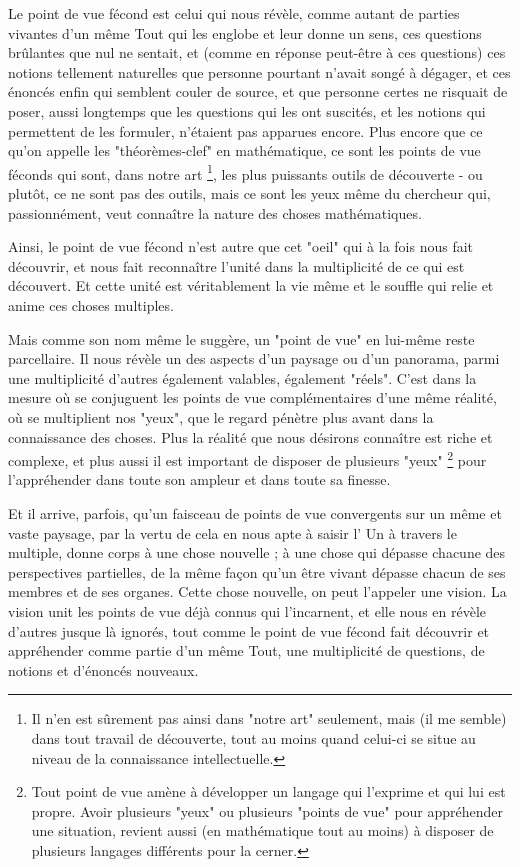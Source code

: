 Le point de vue fécond est celui qui nous révèle, comme autant de parties vivantes d'un même Tout qui les englobe et leur donne un sens, ces questions brûlantes que nul ne sentait, et (comme en réponse peut-être à ces questions) ces notions tellement naturelles que personne pourtant n'avait songé à dégager, et ces énoncés enfin qui semblent couler de source, et que personne certes ne risquait de poser, aussi longtemps que les questions qui les ont suscités, et les notions qui permettent de les formuler, n'étaient pas apparues encore. Plus encore que ce qu'on appelle les "théorèmes-clef" en mathématique, ce sont les points de vue féconds qui sont, dans notre art \footnote{Il n'en est sûrement pas ainsi dans "notre art" seulement, mais (il me semble) dans tout travail de découverte, tout au moins quand celui-ci se situe au niveau de la connaissance intellectuelle.}, les plus puissants outils de découverte - ou plutôt, ce ne sont pas des outils, mais ce sont les yeux même du chercheur qui, passionnément, veut connaître la nature des choses mathématiques.

Ainsi, le point de vue fécond n'est autre que cet "oeil" qui à la fois nous fait découvrir, et nous fait reconnaître l'unité dans la multiplicité de ce qui est découvert. Et cette unité est véritablement la vie même et le souffle qui relie et anime ces choses multiples.

Mais comme son nom même le suggère, un "point de vue" en lui-même reste parcellaire. Il nous révèle un des aspects d'un paysage ou d'un panorama, parmi une multiplicité d'autres également valables, également "réels". C'est dans la mesure où se conjuguent les points de vue complémentaires d'une même réalité, où se multiplient nos "yeux", que le regard pénètre plus avant dans la connaissance des choses. Plus la réalité que nous désirons connaître est riche et complexe, et plus aussi il est important de disposer de plusieurs "yeux" \footnote{Tout point de vue amène à développer un langage qui l'exprime et qui lui est propre. Avoir plusieurs "yeux" ou plusieurs "points de vue" pour appréhender une situation, revient aussi (en mathématique tout au moins) à disposer de plusieurs langages différents pour la cerner.} pour l'appréhender dans toute son ampleur et dans toute sa finesse.

Et il arrive, parfois, qu'un faisceau de points de vue convergents sur un même et vaste paysage, par la vertu de cela en nous apte à saisir l' Un à travers le multiple, donne corps à une chose nouvelle ; à une chose qui dépasse chacune des perspectives partielles, de la même façon qu'un être vivant dépasse chacun de ses membres et de ses organes. Cette chose nouvelle, on peut l'appeler une vision. La vision unit les points de vue déjà connus qui l'incarnent, et elle nous en révèle d'autres jusque là ignorés, tout comme le point de vue fécond fait découvrir et appréhender comme partie d'un même Tout, une multiplicité de questions, de notions et d'énoncés nouveaux.

